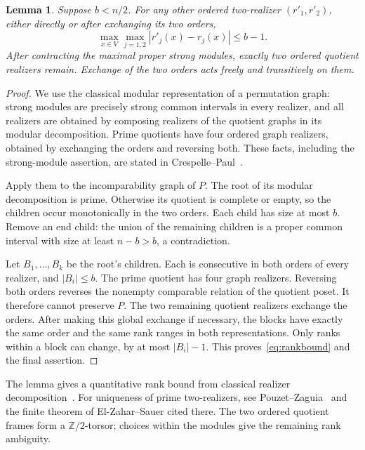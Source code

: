 \documentclass[11pt]{article}
\newtheorem{lemma}[theorem]{Lemma}
\theoremstyle{remark}
\numberwithin{equation}{section}
\begin{document}
\begin{lemma}\label{lem:deterministic}
Suppose $b<n/2$. For any other ordered two-realizer
$(r'_1,r'_2)$, either directly or after exchanging its two orders,
\begin{equation}\label{eq:rankbound}
 \max_{x\in V}\max_{j=1,2}|r'_j(x)-r_j(x)|\le b-1.
\end{equation}
After contracting the maximal proper strong modules, exactly two
ordered quotient realizers remain. Exchange of the two orders acts
freely and transitively on them.
\end{lemma}
\begin{proof}
We use the classical modular representation of a permutation graph:
strong modules are precisely strong common intervals in every realizer,
and all realizers are obtained by composing realizers of the quotient
graphs in its modular decomposition. Prime quotients have four ordered
graph realizers, obtained by exchanging the orders and reversing both.
These facts, including the strong-module assertion, are stated in
Crespelle--Paul~\cite[Section 2.2, Proposition 1]{CP}.

Apply them to the incomparability graph of $P$.
The root of its modular decomposition is prime.
Otherwise its quotient is complete or empty, so the children occur
monotonically in the two orders. Each child has size at most $b$.
Remove an end child: the union of the remaining children is a proper
common interval with size at least $n-b>b$, a contradiction.

Let $B_1,\ldots,B_k$ be the root's children.
Each is consecutive in both orders of every realizer, and $|B_i|\le b$.
The prime quotient has four graph realizers.
Reversing both orders reverses the nonempty comparable relation of
the quotient poset. It therefore cannot preserve $P$.
The two remaining quotient realizers exchange the orders.
After making this global exchange if necessary, the blocks have exactly
the same order and the same rank ranges in both representations.
Only ranks within a block can change, by at most $|B_i|-1$.
This proves~\eqref{eq:rankbound} and the final assertion.
\end{proof}

The lemma gives a quantitative rank bound from classical realizer
decomposition~\cite{CP}. For uniqueness of prime two-realizers, see
Pouzet--Zaguia~\cite[Section 7.2]{PZ} and the finite theorem of
El-Zahar--Sauer cited there. The two ordered quotient frames form a
$\mathbb Z/2$-torsor; choices within the modules give the remaining
rank ambiguity.
\end{document}
